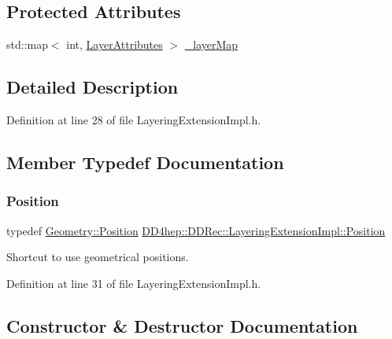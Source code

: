 \subsection*{Protected Attributes}
\begin{DoxyCompactItemize}
\item 
std\+::map$<$ int, \hyperlink{struct_d_d4hep_1_1_d_d_rec_1_1_layering_extension_impl_1_1_layer_attributes}{Layer\+Attributes} $>$ \hyperlink{class_d_d4hep_1_1_d_d_rec_1_1_layering_extension_impl_a59400bb78b40886a131cb8b085df125b}{\+\_\+layer\+Map}
\end{DoxyCompactItemize}


\subsection{Detailed Description}


Definition at line 28 of file Layering\+Extension\+Impl.\+h.



\subsection{Member Typedef Documentation}
\hypertarget{class_d_d4hep_1_1_d_d_rec_1_1_layering_extension_impl_a34281f7585bbe0d61654c9924e2789e3}{}\label{class_d_d4hep_1_1_d_d_rec_1_1_layering_extension_impl_a34281f7585bbe0d61654c9924e2789e3} 
\subsubsection{\texorpdfstring{Position}{Position}}
{\footnotesize\ttfamily typedef \hyperlink{namespace_d_d4hep_1_1_geometry_a55083902099d03506c6db01b80404900}{Geometry\+::\+Position} \hyperlink{class_d_d4hep_1_1_d_d_rec_1_1_layering_extension_impl_a34281f7585bbe0d61654c9924e2789e3}{D\+D4hep\+::\+D\+D\+Rec\+::\+Layering\+Extension\+Impl\+::\+Position}}



Shortcut to use geometrical positions. 



Definition at line 31 of file Layering\+Extension\+Impl.\+h.



\subsection{Constructor \& Destructor Documentation}
\hypertarget{class_d_d4hep_1_1_d_d_rec_1_1_layering_extension_impl_a870512f3f48cb5ad014fbe822a50be67}{}\label{class_d_d4hep_1_1_d_d_rec_1_1_layering_extension_impl_a870512f3f48cb5ad014fbe822a50be67} 
